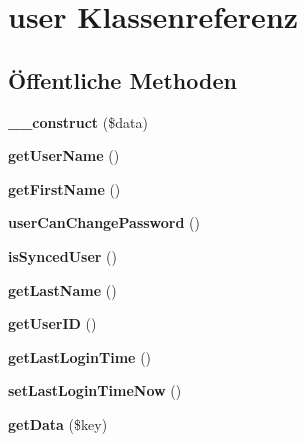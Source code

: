 \hypertarget{classuser}{}\section{user Klassenreferenz}
\label{classuser}
\subsection*{Öffentliche Methoden}
\begin{DoxyCompactItemize}
\item 
\mbox{\label{classuser_ad9213fa48daf38e4279d9cc14a7ad59f}} 
{\bfseries \+\_\+\+\_\+construct} (\$data)
\item 
\mbox{\label{classuser_a7a28248badbc7e83015a701185e4781d}} 
{\bfseries get\+User\+Name} ()
\item 
\mbox{\label{classuser_ad0fc04cb4c2f4093563a3a1a67042585}} 
{\bfseries get\+First\+Name} ()
\item 
\mbox{\label{classuser_a5616fb987f49080501694d2bc3c356a0}} 
{\bfseries user\+Can\+Change\+Password} ()
\item 
\mbox{\label{classuser_a86562342682d2f52d68af62c9c3428d5}} 
{\bfseries is\+Synced\+User} ()
\item 
\mbox{\label{classuser_a2d4f014b7a1ded5083c3c0eb03dd4ab0}} 
{\bfseries get\+Last\+Name} ()
\item 
\mbox{\label{classuser_ac790020a6c3bc8093a0c4473e06c2547}} 
{\bfseries get\+User\+ID} ()
\item 
\mbox{\label{classuser_ab685741e0b662b0cd5c65a963277efa9}} 
{\bfseries get\+Last\+Login\+Time} ()
\item 
\mbox{\label{classuser_a2e6614e0ad40df9748fc405a9659e3c2}} 
{\bfseries set\+Last\+Login\+Time\+Now} ()
\item 
\mbox{\label{classuser_abf6dc919456194fae9b6d6e0ef5b2e07}} 
{\bfseries get\+Data} (\$key)
\item 
\mbox{\label{classuser_a9130754bcc2fa2fd96ad342608b32f31}} 

\end{DoxyCompactItemize}
